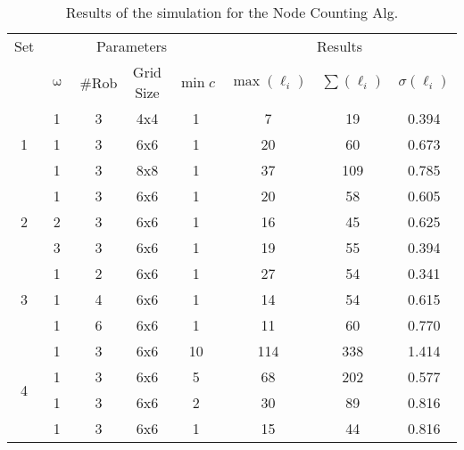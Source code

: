 
\begin{table}[H]
\centering
\begin{tabular}{@{}cccccccc@{}}
\toprule
Set                & \multicolumn{4}{c}{Parameters}  & \multicolumn{3}{c}{Results}              \\ \cmidrule(lr){2-5} \cmidrule(lr){6-8}
                   & $\upomega$ & \#Rob & Grid Size & $\min c$ & $\max(\ell_i)$ & $\sum(\ell_i)$ & $\sigma(\ell_i)$ \\ \midrule
\multirow{3}{*}{1} & 1           & 3     & 4x4       &   1     &   7        &  19       &   0.394   \\
                             & 1           & 3     & 6x6       &   1     &   20      &  60       &   0.673    \\
                             & 1           & 3     & 8x8       &   1     &   37      &  109     &   0.785    \\ \midrule
\multirow{3}{*}{2} & 1           & 3     & 6x6       &   1     &   20      &  58       &  0.605     \\
                             & 2           & 3     & 6x6       &   1     &   16      &  45       &  0.625     \\
                             & 3           & 3     & 6x6       &   1     &   19      &  55       &  0.394     \\ \midrule
\multirow{3}{*}{3} & 1           & 2     & 6x6       &   1     &   27      &  54       & 0.341       \\
                             & 1           & 4     & 6x6       &   1     &   14      &  54       & 0.615       \\
                             & 1           & 6     & 6x6       &   1     &   11      &  60       & 0.770       \\ \midrule
\multirow{4}{*}{4} & 1           & 3     & 6x6       &   10     &  114	&  338       & 1.414           \\
                             & 1           & 3     & 6x6       &   5     &  68      &   202   &   0.577        \\
                             & 1           & 3     & 6x6       &   2     &  30      &  89      &   0.816       \\
                             & 1           & 3     & 6x6       &   1    &  15     &   44     &   0.816       \\ \bottomrule
\end{tabular}
\caption{Results of the simulation for the Node Counting Alg.}
\label{tab:NC_results}
\end{table}

